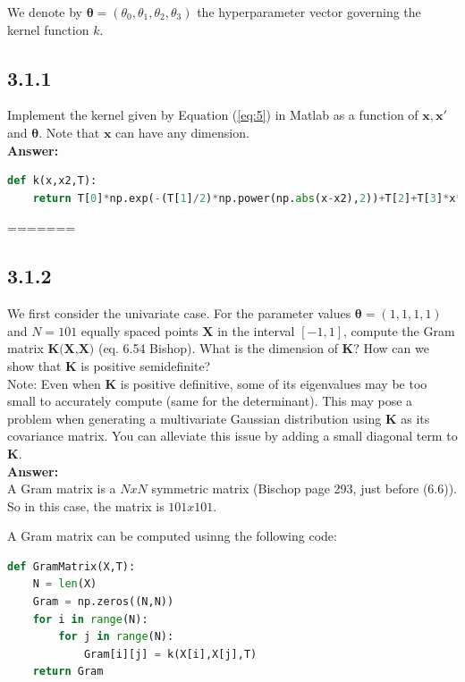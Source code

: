 \documentclass[a4paper]{article}
\begin{document}
We denote by $\boldsymbol{\theta}  = (\theta_0, \theta_1, \theta_2, \theta_3)$ the hyperparameter vector governing the kernel function $k$.

\subsection*{3.1.1}

Implement the kernel given by Equation (\ref{eq:5}) in Matlab as a function of $\textbf{x}, \textbf{x}'$ and $\boldsymbol{\theta}$. Note that $\textbf{x}$ can have any dimension.\\

\textbf{Answer:}\\


\begin{lstlisting}[language=Python]
def k(x,x2,T):
    return T[0]*np.exp(-(T[1]/2)*np.power(np.abs(x-x2),2))+T[2]+T[3]*x*x2
\end{lstlisting}
=======



\subsection*{3.1.2}

We first consider the univariate case. For the parameter values $\boldsymbol{\theta} = (1,1,1,1)$ and $N = 101$ equally spaced points $\textbf{X}$ in the interval $[-1,1]$, compute the Gram matrix $\textbf{K(X,X)}$ (eq. 6.54 Bishop). What is the dimension of \textbf{K}? How can we show that \textbf{K} is positive semidefinite?\\



Note: Even when \textbf{K} is positive definitive, some of its eigenvalues may be too small to accurately compute (same for the determinant). This may pose a problem when generating a multivariate Gaussian distribution using \textbf{K} as its covariance matrix. You can alleviate this issue by adding a small diagonal term to \textbf{K}.\\


\textbf{Answer:}\\



A Gram matrix is a $N x N$ symmetric matrix (Bischop page 293, just before (6.6)). So in this case, the matrix is $101 x 101$.

A Gram matrix can be computed usinng the following code:

\begin{lstlisting}[language=Python]
def GramMatrix(X,T):
    N = len(X)
    Gram = np.zeros((N,N))
    for i in range(N):
        for j in range(N):
            Gram[i][j] = k(X[i],X[j],T)
    return Gram
\end{lstlisting}
\end{document}
